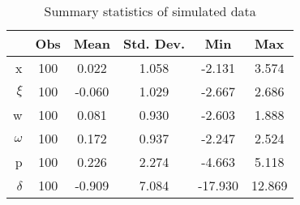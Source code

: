 \begin{table}[htb]
\centering
\caption{Summary statistics of simulated data}
\begin{tabular}{r|ccccc}
\toprule
  & Obs & Mean   & Std. Dev. & Min     & Max    \\ \hline
x & 100 &  0.022 &     1.058 &  -2.131 &  3.574 \\
$\xi$ & 100 & -0.060 &     1.029 &  -2.667 &  2.686 \\
w & 100 &  0.081 &     0.930 &  -2.603 &  1.888 \\
$\omega$ & 100 &  0.172 &     0.937 &  -2.247 &  2.524 \\
p & 100 &  0.226 &     2.274 &  -4.663 &  5.118 \\
$\delta$ & 100 & -0.909 &     7.084 & -17.930 & 12.869 \\
\bottomrule
\end{tabular}
\end{table}